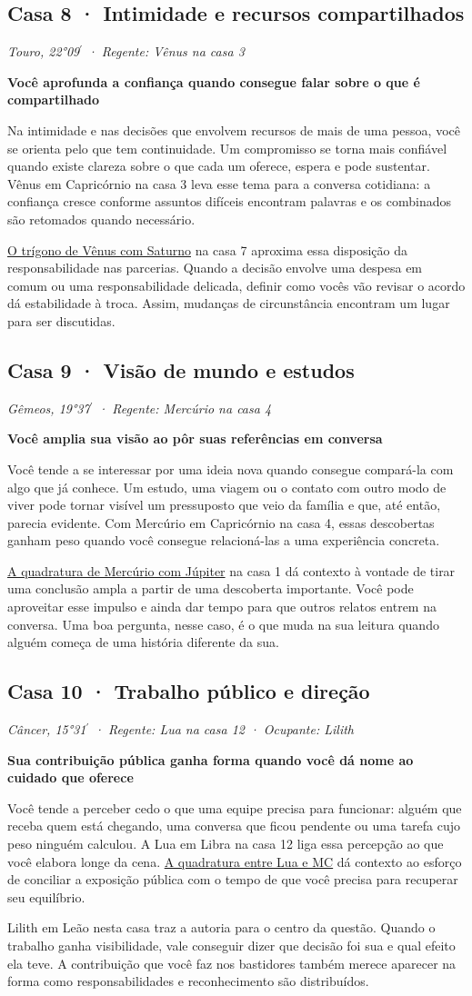 \documentclass[11pt,a4paper]{article}
\newcommand{\leitura}[3]{\subsection{#1}\textit{#2}\par #3}
\newcommand{\subtituloleitura}[1]{\textbf{#1}\par\nopagebreak[4]}
\newcommand{\aspectoref}[2]{\hyperref[#1]{#2}}
\begin{document}
\leitura{Casa 8 · Intimidade e recursos compartilhados}{Touro, 22°09\ensuremath{^{\prime}} · Regente: Vênus na casa 3}{
\subtituloleitura{Você aprofunda a confiança quando consegue falar sobre o que é compartilhado}
Na intimidade e nas decisões que envolvem recursos de mais de uma pessoa, você se orienta pelo que tem continuidade. Um compromisso se torna mais confiável quando existe clareza sobre o que cada um oferece, espera e pode sustentar. Vênus em Capricórnio na casa 3 leva esse tema para a conversa cotidiana: a confiança cresce conforme assuntos difíceis encontram palavras e os combinados são retomados quando necessário.

\aspectoref{aspecto:venus-saturno}{O trígono de Vênus com Saturno} na casa 7 aproxima essa disposição da responsabilidade nas parcerias. Quando a decisão envolve uma despesa em comum ou uma responsabilidade delicada, definir como vocês vão revisar o acordo dá estabilidade à troca. Assim, mudanças de circunstância encontram um lugar para ser discutidas.
}

\leitura{Casa 9 · Visão de mundo e estudos}{Gêmeos, 19°37\ensuremath{^{\prime}} · Regente: Mercúrio na casa 4}{
\subtituloleitura{Você amplia sua visão ao pôr suas referências em conversa}
Você tende a se interessar por uma ideia nova quando consegue compará-la com algo que já conhece. Um estudo, uma viagem ou o contato com outro modo de viver pode tornar visível um pressuposto que veio da família e que, até então, parecia evidente. Com Mercúrio em Capricórnio na casa 4, essas descobertas ganham peso quando você consegue relacioná-las a uma experiência concreta.

\aspectoref{aspecto:mercurio-jupiter}{A quadratura de Mercúrio com Júpiter} na casa 1 dá contexto à vontade de tirar uma conclusão ampla a partir de uma descoberta importante. Você pode aproveitar esse impulso e ainda dar tempo para que outros relatos entrem na conversa. Uma boa pergunta, nesse caso, é o que muda na sua leitura quando alguém começa de uma história diferente da sua.
}

\leitura{Casa 10 · Trabalho público e direção}{Câncer, 15°31\ensuremath{^{\prime}} · Regente: Lua na casa 12 · Ocupante: Lilith}{
\subtituloleitura{Sua contribuição pública ganha forma quando você dá nome ao cuidado que oferece}
Você tende a perceber cedo o que uma equipe precisa para funcionar: alguém que receba quem está chegando, uma conversa que ficou pendente ou uma tarefa cujo peso ninguém calculou. A Lua em Libra na casa 12 liga essa percepção ao que você elabora longe da cena. \aspectoref{aspecto:mc-lua}{A quadratura entre Lua e MC} dá contexto ao esforço de conciliar a exposição pública com o tempo de que você precisa para recuperar seu equilíbrio.

Lilith em Leão nesta casa traz a autoria para o centro da questão. Quando o trabalho ganha visibilidade, vale conseguir dizer que decisão foi sua e qual efeito ela teve. A contribuição que você faz nos bastidores também merece aparecer na forma como responsabilidades e reconhecimento são distribuídos.
}
\end{document}
